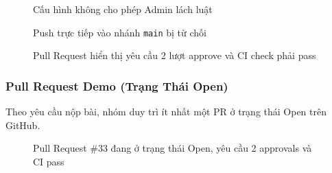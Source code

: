 \begin{figure}[H]
\centering
{}
\caption{Cấu hình không cho phép Admin lách luật}
\end{figure}

\begin{figure}[H]
\centering
{}
\caption{Push trực tiếp vào nhánh \texttt{main} bị từ chối}
\end{figure}

\begin{figure}[H]
\centering
{}
\caption{Pull Request hiển thị yêu cầu 2 lượt approve và CI check phải pass}
\end{figure}

\subsubsection{Pull Request Demo (Trạng Thái Open)}

Theo yêu cầu nộp bài, nhóm duy trì ít nhất một PR ở trạng thái Open trên GitHub.

\begin{figure}[H]
\centering
{}
\caption{Pull Request \#33 đang ở trạng thái Open, yêu cầu 2 approvals và CI pass}
\end{figure}
